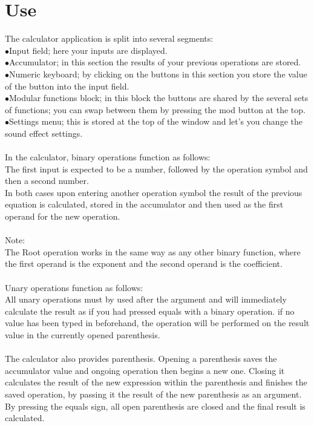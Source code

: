 \documentclass{article}
\begin{document}
\section{Use}
	The calculator application is split into several segments:\\
	$\bullet$Input field; here your inputs are displayed.\\
	$\bullet$Accumulator; in this section the results of your previous operations are stored.\\
	$\bullet$Numeric keyboard; by clicking on the buttons in this section you store the value of the button into the input field.\\
	$\bullet$Modular functions block; in this block the buttons are shared by the several sets of functions; you can swap between them by pressing the mod button at the top.\\
	$\bullet$Settings menu; this is stored at the top of the window and let's you change the sound effect settings.\\
	\\
	In the calculator, binary operations function as follows:\\
	The first input is expected to be a number, followed by the operation symbol and then a second number.\\
	In both cases upon entering another operation symbol the result of the previous equation is calculated, stored in the accumulator and then used as the first operand for the new operation.\\
	\\
	Note:\\
	The Root operation works in the same way as any other binary function, where the first operand is the exponent and the second operand is the coefficient. \\
	\\
	Unary operations function as follows:\\
	All unary operations must by used after the argument and will immediately calculate the result as if you had pressed equals with a binary operation. if no value has been typed in beforehand, the operation will be performed on the result value in the currently opened parenthesis.\\
	\\
	The calculator also provides parenthesis. Opening a parenthesis saves the accumulator value and ongoing operation then begins a new one. Closing it calculates the result of the new expression within the parenthesis and finishes the saved operation, by passing it the result of the new parenthesis as an argument. By pressing the equals sign, all open parenthesis are closed and the final result is calculated.
\end{document}
